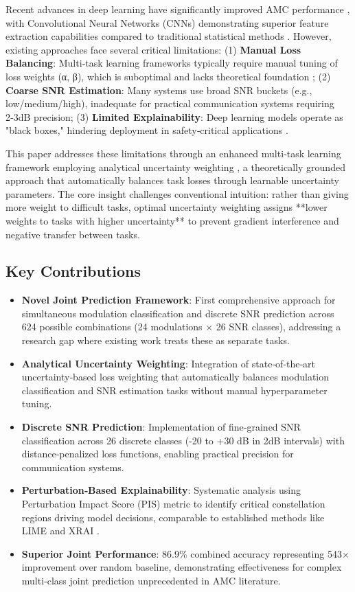 \documentclass{ELSP}
\begin{document}
Recent advances in deep learning have significantly improved AMC performance \cite{peng2021survey}, with Convolutional Neural Networks (CNNs) demonstrating superior feature extraction capabilities compared to traditional statistical methods \cite{nandi1995cumulants,azzouz1995automatic}. However, existing approaches face several critical limitations: (1) \textbf{Manual Loss Balancing}: Multi‑task learning frameworks typically require manual tuning of loss weights (α, β), which is suboptimal and lacks theoretical foundation \cite{zhang2021survey}; (2) \textbf{Coarse SNR Estimation}: Many systems use broad SNR buckets (e.g., low/medium/high), inadequate for practical communication systems requiring 2‑3dB precision; (3) \textbf{Limited Explainability}: Deep learning models operate as "black boxes," hindering deployment in safety‑critical applications \cite{wong2021explainable}.

This paper addresses these limitations through an enhanced multi‑task learning framework employing analytical uncertainty weighting \cite{liu2024analytical}, a theoretically grounded approach that automatically balances task losses through learnable uncertainty parameters. The core insight challenges conventional intuition: rather than giving more weight to difficult tasks, optimal uncertainty weighting \cite{kendall2018multi} assigns **lower weights to tasks with higher uncertainty** to prevent gradient interference and negative transfer between tasks.

\subsection*{Key Contributions}
\begin{itemize}
\item \textbf{Novel Joint Prediction Framework}: First comprehensive approach for simultaneous modulation classification and discrete SNR prediction across 624 possible combinations (24 modulations × 26 SNR classes), addressing a research gap where existing work treats these as separate tasks.
\item \textbf{Analytical Uncertainty Weighting}: Integration of state‑of‑the‑art uncertainty‑based loss weighting that automatically balances modulation classification and SNR estimation tasks without manual hyperparameter tuning.
\item \textbf{Discrete SNR Prediction}: Implementation of fine‑grained SNR classification across 26 discrete classes (-20 to +30 dB in 2dB intervals) with distance‑penalized loss functions, enabling practical precision for communication systems.
\item \textbf{Perturbation‑Based Explainability}: Systematic analysis using Perturbation Impact Score (PIS) metric to identify critical constellation regions driving model decisions, comparable to established methods like LIME \cite{10.1145/2939672.2939778} and XRAI \cite{kapishnikov2019xrai}.
\item \textbf{Superior Joint Performance}: 86.9\% combined accuracy representing 543× improvement over random baseline, demonstrating effectiveness for complex multi‑class joint prediction unprecedented in AMC literature.
\end{itemize}
\end{document}
